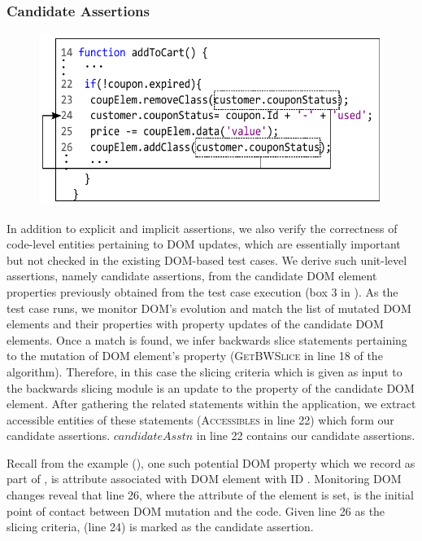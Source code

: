 \subsubsection{Candidate Assertions} \label{Sec:candidateAssertions}

\begin{figure}[!t]
  \centering
  \includegraphics[width=.9\hsize]{fig/candidateDOMToCode}
  \vspace{-0.1in} 
  \label{Fig:candidateDOMToCode}
  \vspace{-0.1in} 
\end{figure}
In addition to explicit and implicit assertions, we also verify the correctness of code-level entities pertaining to DOM updates, which are essentially important but not checked in the existing DOM-based test cases. We derive such unit-level assertions, namely candidate assertions, from the candidate DOM element properties previously obtained from the test case execution (box 3 in ). As the test case runs, we monitor DOM's evolution and match the list of mutated DOM elements and their properties with property updates of the candidate DOM elements. Once a match is found, we infer backwards slice statements pertaining to the mutation of DOM element's property (\textsc{GetBWSlice} in line 18 of the algorithm). Therefore, in this case the slicing criteria which is given as input to the backwards slicing module is an update to the property of the candidate DOM element.
After gathering the related \javascript statements within the application, we extract accessible entities of these statements (\textsc{Accessibles} in line 22) which form our candidate assertions. $candidateAsstn$ in line 22 contains our candidate assertions. 

Recall from the example (), one such potential DOM property which we record as part of , is  attribute associated with DOM element with ID . Monitoring DOM changes reveal that line 26, where the  attribute of the element is set, is the initial point of contact between DOM mutation and the \javascript code. Given line 26 as the slicing criteria,  (line 24) is marked as the candidate assertion.